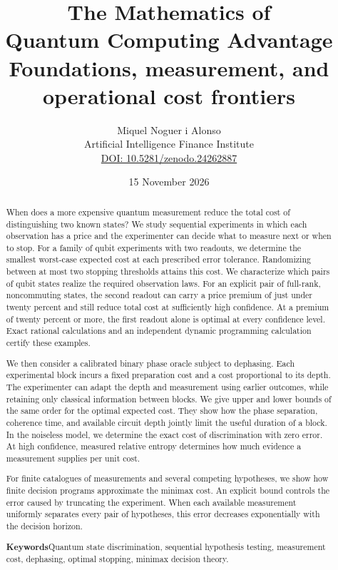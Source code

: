 \documentclass[11pt,a4paper]{article}
\title{\textbf{The Mathematics of\\Quantum Computing Advantage}\\[6pt]
\large Foundations, measurement, and operational cost frontiers}
\author{Miquel Noguer i Alonso\\[-1pt]
\small Artificial Intelligence Finance Institute\\[-1pt]
\small\href{https://doi.org/10.5281/zenodo.24262887}{DOI: 10.5281/zenodo.24262887}}
\date{15 November 2026}
\theoremstyle{definition}
\theoremstyle{remark}
\numberwithin{equation}{section}
\begin{document}
\maketitle
\vspace{-15pt}
\begin{abstract}
When does a more expensive quantum measurement reduce the total cost of
distinguishing two known states? We study sequential experiments in which each
observation has a price and the experimenter can decide what to measure next
or when to stop. For a family of qubit experiments with two readouts, we
determine the smallest worst-case expected cost at each prescribed error
tolerance. Randomizing between at most two stopping thresholds attains this
cost. We characterize which pairs of qubit states realize the required
observation laws. For an explicit pair of full-rank, noncommuting states, the
second readout can carry a price premium of just under twenty percent and
still reduce total cost at sufficiently high confidence. At a premium of
twenty percent or more, the first readout alone is optimal at every confidence
level. Exact rational calculations and an independent dynamic programming
calculation certify these examples.

We then consider a calibrated binary phase oracle subject to dephasing. Each
experimental block incurs a fixed preparation cost and a cost proportional to
its depth. The experimenter can adapt the depth and measurement using earlier
outcomes, while retaining only classical information between blocks. We give
upper and lower bounds of the same order for the optimal expected cost. They
show how the phase separation, coherence time, and available circuit depth
jointly limit the useful duration of a block. In the noiseless model, we
determine the exact cost of discrimination with zero error. At high
confidence, measured relative entropy determines how much evidence a
measurement supplies per unit cost.

For finite catalogues of measurements and several competing hypotheses, we
show how finite decision programs approximate the minimax cost. An explicit
bound controls the error caused by truncating the experiment. When each
available measurement uniformly separates every pair of hypotheses, this error
decreases exponentially with the decision horizon.

\noindent\textbf{Keywords}\enspace Quantum state discrimination, sequential hypothesis testing, measurement cost, dephasing, optimal stopping, minimax decision theory.
\end{abstract}
\clearpage
\setcounter{tocdepth}{1}
{\small\setlength{\parskip}{0pt}\tableofcontents}
\clearpage
\end{document}

